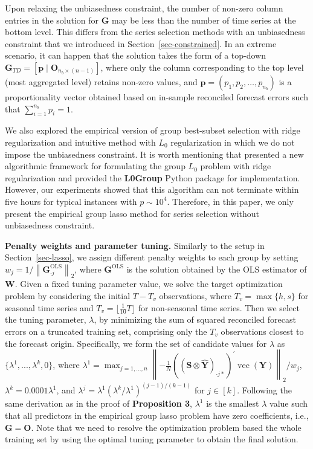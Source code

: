 \documentclass[11pt,a4paper,]{article}
\begin{document}
Upon relaxing the unbiasedness constraint, the number of non-zero column
entries in the solution for \(\boldsymbol{G}\) may be less than the
number of time series at the bottom level. This differs from the series
selection methods with an unbiasedness constraint that we introduced in
Section~\ref{sec-constrained}. In an extreme scenario, it can happen
that the solution takes the form of a top-down
\(\boldsymbol{G}_{TD}=[\boldsymbol{p} \mid \boldsymbol{O}_{n_b \times (n-1)}]\),
where only the column corresponding to the top level (most aggregated
level) retains non-zero values, and
\(\boldsymbol{p} = (p_1, p_2, \ldots, p_{n_b})\) is a proportionality
vector obtained based on in-sample reconciled forecast errors such that
\(\sum_{i=1}^{n_b} p_i=1\).

We also explored the empirical version of group best-subset selection
with ridge regularization and intuitive method with \(L_0\)
regularization in which we do not impose the unbiasedness constraint. It
is worth mentioning that \textcite{Hazimeh2023-ie} presented a new
algorithmic framework for formulating the group \(L_0\) problem with
ridge regularization and provided the \textbf{L0Group} Python package
for implementation. However, our experiments showed that this algorithm
can not terminate within five hours for typical instances with
\(p \sim 10^4\). Therefore, in this paper, we only present the empirical
group lasso method for series selection without unbiasedness constraint.

\textbf{Penalty weights and parameter tuning.} Similarly to the setup in
Section~\ref{sec-lasso}, we assign different penalty weights to each
group by setting
\(w_j = 1/\left\|\boldsymbol{G}_{\cdot j}^{\text{OLS}}\right\|_2\),
where \(\boldsymbol{G}^{\text{OLS}}\) is the solution obtained by the
OLS estimator of \(\boldsymbol{W}\). Given a fixed tuning parameter
value, we solve the target optimization problem by considering the
initial \(T-T_v\) observations, where \(T_v = \max\{h, s\}\) for
seasonal time series and \(T_v = \lfloor \frac{1}{10}T \rfloor\) for
non-seasonal time series. Then we select the tuning parameter,
\(\lambda\), by minimizing the sum of squared reconciled forecast errors
on a truncated training set, comprising only the \(T_v\) observations
closest to the forecast origin. Specifically, we form the set of
candidate values for \(\lambda\) as
\(\{\lambda^{1},...,\lambda^{k}, 0\}\), where
\(\lambda^{1} = \max _{j=1, \ldots, n}\left\|-\frac{1}{N}\left(\left(\boldsymbol{S} \otimes \hat{\boldsymbol{Y}}\right)_{\cdot j*}\right)^{\prime} \operatorname{vec}(\boldsymbol{Y})\right\|_2 / w_j\),
\(\lambda^{k} = 0.0001\lambda^{1}\), and
\(\lambda^{j} = \lambda^{1}\left(\lambda^{k} / \lambda^{1}\right)^{(j-1) / (k-1)}\)
for \(j \in [k]\). Following the same derivation as in the proof of
\textbf{Proposition 3}, \(\lambda^{1}\) is the smallest \(\lambda\)
value such that all predictors in the empirical group lasso problem have
zero coefficients, i.e., \(\boldsymbol{G} = \boldsymbol{O}\). Note that
we need to resolve the optimization problem based the whole training set
by using the optimal tuning parameter to obtain the final solution.
\end{document}
